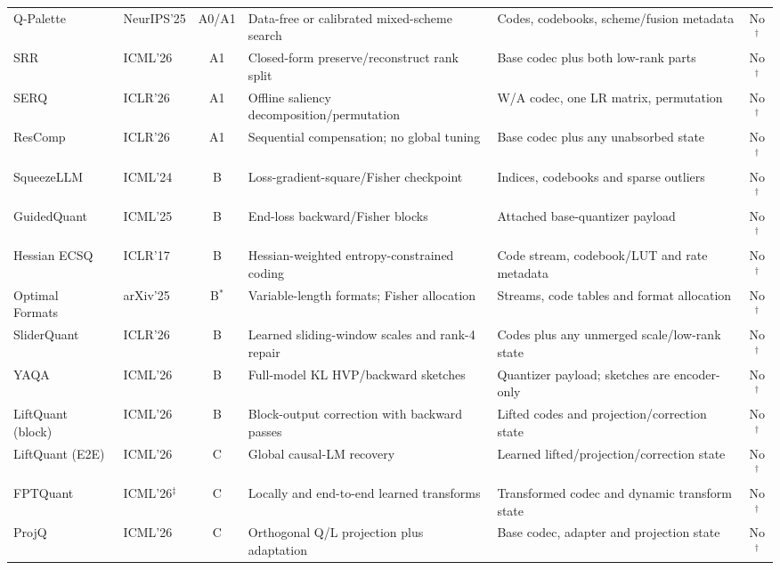 \begin{tabular}{@{}p{2.65cm}p{1.50cm}cp{4.05cm}p{4.10cm}c@{}}
Q-Palette~\citep{lee2025qpalette} & NeurIPS'25 & A0/A1 & Data-free or calibrated mixed-scheme search & Codes, codebooks, scheme/fusion metadata & No$^\dagger$ \\
SRR~\citep{cho2026srr} & ICML'26 & A1 & Closed-form preserve/reconstruct rank split & Base codec plus both low-rank parts & No$^\dagger$ \\
SERQ~\citep{park2026serq} & ICLR'26 & A1 & Offline saliency decomposition/permutation & W/A codec, one LR matrix, permutation & No$^\dagger$ \\
ResComp~\citep{li2026rescomp} & ICLR'26 & A1 & Sequential compensation; no global tuning & Base codec plus any unabsorbed state & No$^\dagger$ \\
\midrule
SqueezeLLM~\citep{kim2024squeezellm} & ICML'24 & B & Loss-gradient-square/Fisher checkpoint & Indices, codebooks and sparse outliers & No$^\dagger$ \\
GuidedQuant~\citep{kim2025guidedquant} & ICML'25 & B & End-loss backward/Fisher blocks & Attached base-quantizer payload & No$^\dagger$ \\
Hessian ECSQ~\citep{choi2017towards} & ICLR'17 & B & Hessian-weighted entropy-constrained coding & Code stream, codebook/LUT and rate metadata & No$^\dagger$ \\
Optimal Formats~\citep{orr2025optimal} & arXiv'25 & B$^*$ & Variable-length formats; Fisher allocation & Streams, code tables and format allocation & No$^\dagger$ \\
SliderQuant~\citep{wang2026sliderquant} & ICLR'26 & B & Learned sliding-window scales and rank-4 repair & Codes plus any unmerged scale/low-rank state & No$^\dagger$ \\
YAQA~\citep{tseng2026yaqa} & ICML'26 & B & Full-model KL HVP/backward sketches & Quantizer payload; sketches are encoder-only & No$^\dagger$ \\
LiftQuant (block)~\citep{he2026liftquant} & ICML'26 & B & Block-output correction with backward passes & Lifted codes and projection/correction state & No$^\dagger$ \\
\midrule
LiftQuant (E2E)~\citep{he2026liftquant} & ICML'26 & C & Global causal-LM recovery & Learned lifted/projection/correction state & No$^\dagger$ \\
FPTQuant~\citep{vanbreugel2026fptquant} & ICML'26$^\ddagger$ & C & Locally and end-to-end learned transforms & Transformed codec and dynamic transform state & No$^\dagger$ \\
ProjQ~\citep{yu2026projq} & ICML'26 & C & Orthogonal Q/L projection plus adaptation & Base codec, adapter and projection state & No$^\dagger$ \\

\end{tabular}
